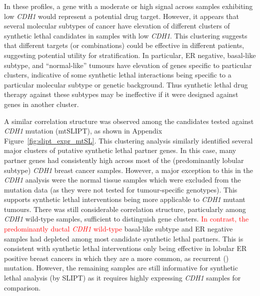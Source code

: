 In these  profiles, a gene with a moderate or high signal across samples exhibiting low \textit{CDH1}  would represent a potential drug target. However, it appears that several molecular subtypes of cancer have elevation of different clusters of \gls{synthetic lethal} candidates in samples with low \textit{CDH1}. This clustering suggests that different targets (or combinations) could be effective in different patients, suggesting potential utility for stratification.  In particular, \gls{ER} negative, basal-like subtype, and ``normal-like'' tumours \citep{Eroles2012, Parker2009, Dai2015} have elevation of genes specific to particular clusters, indicative of some \gls{synthetic lethal} interactions being specific to a particular molecular subtype or genetic background. Thus \gls{synthetic lethal} drug therapy against these subtypes may be ineffective if it were designed against genes in another cluster.
 
A similar correlation structure was observed among the candidates tested against \textit{CDH1} \gls{mutation} (\acrshort{mtSLIPT}), as shown in Appendix Figure~\ref{fig:slipt_expr_mtSL}. This clustering analysis similarly identified several major clusters of putative \gls{synthetic lethal} partner genes. In this case, many partner genes had consistently high  across most of the (predominantly lobular subtype) \textit{CDH1} breast cancer samples. However, a major exception to this in the \textit{CDH1}  analysis were the normal tissue samples which were excluded from the \gls{mutation} data (as they were not tested for tumour-specific genotypes). This supports \gls{synthetic lethal} interventions being more applicable to \textit{CDH1} \gls{mutant} tumours. There was still considerable correlation structure, particularly among \textit{CDH1} \gls{wild-type} samples, sufficient to distinguish gene clusters. \textcolor{red}{In contrast, the predominantly ductal \textit{CDH1} \gls{wild-type}} basal-like subtype and \gls{ER} negative samples had depleted  among most candidate \gls{synthetic lethal} partners. This is consistent with \gls{synthetic lethal} interventions only being effective in lobular \gls{ER} positive breast cancers in which they are a more common, as recurrent () \gls{mutation}. However, the remaining samples are still informative for \gls{synthetic lethal} analysis (by \gls{SLIPT}) as it requires highly expressing \textit{CDH1} samples for comparison.

